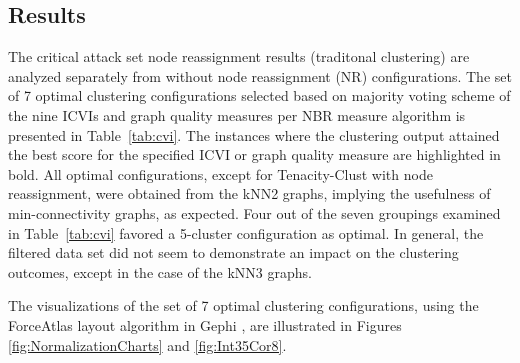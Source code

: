 \documentclass{bmcart}
\begin{document}
 


\subsection*{Results}

The critical attack set node reassignment results (traditonal clustering) are analyzed separately from without node reassignment (NR) configurations.
The set of 7 optimal clustering configurations selected based on majority voting scheme of the nine ICVIs and graph quality measures per NBR measure algorithm is presented in Table~\ref{tab:cvi}. 
The instances where the clustering output attained the best score for the specified ICVI or graph quality measure are highlighted in bold.  
All optimal configurations, except for Tenacity-Clust with node reassignment, were obtained from the kNN2 graphs, implying the usefulness of min-connectivity graphs, as expected. 
Four out of the seven groupings examined in Table~\ref{tab:cvi} favored a 5-cluster configuration as optimal.
In general, the filtered data set did not seem to demonstrate an impact on the clustering outcomes, except in the case of the kNN3 graphs. 

The visualizations of the set of 7 optimal clustering configurations, using the ForceAtlas layout algorithm in Gephi \cite{bastian2009gephi}, are illustrated in Figures \ref{fig:NormalizationCharts} and \ref{fig:Int35Cor8}. 





\end{document}
